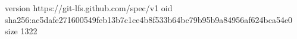 version https://git-lfs.github.com/spec/v1
oid sha256:ac5dafe271600549feb13b7c1ce4b8f533b64bc79b95b9a84956af624bca54e0
size 1322
